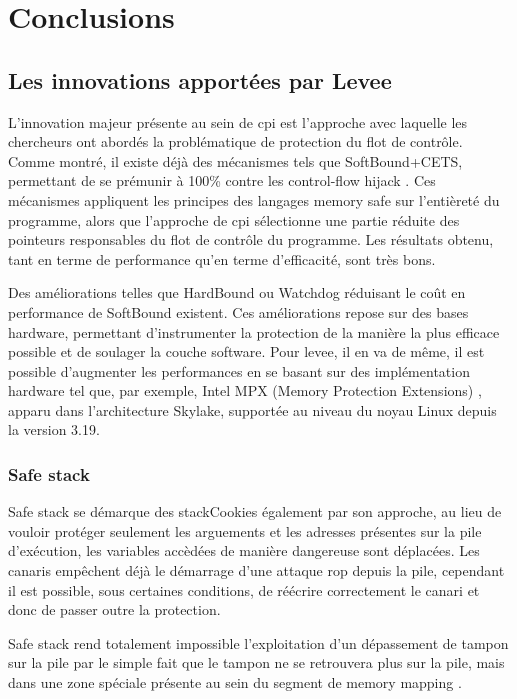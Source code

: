 \chapter{Conclusions}
\label{chap:conclusions}

\section{Les innovations apportées par Levee}

L'innovation majeur présente au sein de \gls{cpi} est l'approche avec laquelle
les chercheurs ont abordés la problématique de protection du flot de contrôle.
Comme montré, il existe déjà des mécanismes tels que SoftBound+CETS,
permettant de se prémunir à 100\% contre les \og control-flow hijack \fg.
Ces mécanismes appliquent les principes des langages \og memory safe \fg sur
l'entièreté du programme, alors que l'approche de \gls{cpi} sélectionne une
partie réduite des pointeurs responsables du flot de contrôle du programme.
Les résultats obtenu, tant en terme de performance qu'en terme d'efficacité,
sont très bons.

Des améliorations telles que HardBound ou Watchdog réduisant le coût en
performance de SoftBound existent. Ces améliorations repose sur des bases
hardware, permettant d'instrumenter la protection de la manière la plus efficace
possible et de soulager la couche software. Pour \gls{levee}, il en va de même,
il est possible d'augmenter les performances en se basant sur des implémentation
hardware tel que, par exemple, Intel MPX (Memory Protection Extensions)
\cite{IntelMPX}, apparu dans l'architecture Skylake, supportée au niveau
du noyau Linux depuis la version 3.19.

\subsection{\og Safe stack \fg}

\og Safe stack \fg se démarque des \og \gls{stackCookies} \fg également par
son approche, au lieu de vouloir protéger seulement les arguements et les adresses
présentes sur la pile d'exécution, les variables accèdées de manière dangereuse
sont déplacées. Les canaris empêchent déjà le démarrage d'une attaque \gls{rop} depuis
la pile, cependant il est possible, sous certaines conditions, de réécrire correctement
le canari et donc de passer outre la protection.

\og Safe stack \fg rend totalement impossible l'exploitation d'un dépassement de
tampon sur la pile par le simple fait que le tampon ne se retrouvera plus sur la pile,
mais dans une zone spéciale présente au sein du segment de \og memory mapping \fg.

